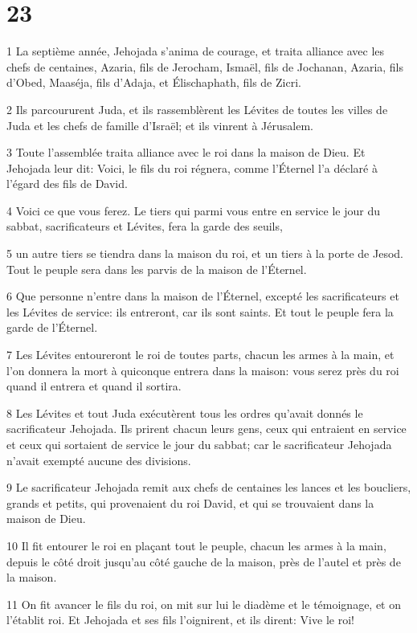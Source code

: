 \chapter{23}

\par 1 La septième année, Jehojada s'anima de courage, et traita alliance avec les chefs de centaines, Azaria, fils de Jerocham, Ismaël, fils de Jochanan, Azaria, fils d'Obed, Maaséja, fils d'Adaja, et Élischaphath, fils de Zicri.
\par 2 Ils parcoururent Juda, et ils rassemblèrent les Lévites de toutes les villes de Juda et les chefs de famille d'Israël; et ils vinrent à Jérusalem.
\par 3 Toute l'assemblée traita alliance avec le roi dans la maison de Dieu. Et Jehojada leur dit: Voici, le fils du roi régnera, comme l'Éternel l'a déclaré à l'égard des fils de David.
\par 4 Voici ce que vous ferez. Le tiers qui parmi vous entre en service le jour du sabbat, sacrificateurs et Lévites, fera la garde des seuils,
\par 5 un autre tiers se tiendra dans la maison du roi, et un tiers à la porte de Jesod. Tout le peuple sera dans les parvis de la maison de l'Éternel.
\par 6 Que personne n'entre dans la maison de l'Éternel, excepté les sacrificateurs et les Lévites de service: ils entreront, car ils sont saints. Et tout le peuple fera la garde de l'Éternel.
\par 7 Les Lévites entoureront le roi de toutes parts, chacun les armes à la main, et l'on donnera la mort à quiconque entrera dans la maison: vous serez près du roi quand il entrera et quand il sortira.
\par 8 Les Lévites et tout Juda exécutèrent tous les ordres qu'avait donnés le sacrificateur Jehojada. Ils prirent chacun leurs gens, ceux qui entraient en service et ceux qui sortaient de service le jour du sabbat; car le sacrificateur Jehojada n'avait exempté aucune des divisions.
\par 9 Le sacrificateur Jehojada remit aux chefs de centaines les lances et les boucliers, grands et petits, qui provenaient du roi David, et qui se trouvaient dans la maison de Dieu.
\par 10 Il fit entourer le roi en plaçant tout le peuple, chacun les armes à la main, depuis le côté droit jusqu'au côté gauche de la maison, près de l'autel et près de la maison.
\par 11 On fit avancer le fils du roi, on mit sur lui le diadème et le témoignage, et on l'établit roi. Et Jehojada et ses fils l'oignirent, et ils dirent: Vive le roi!

